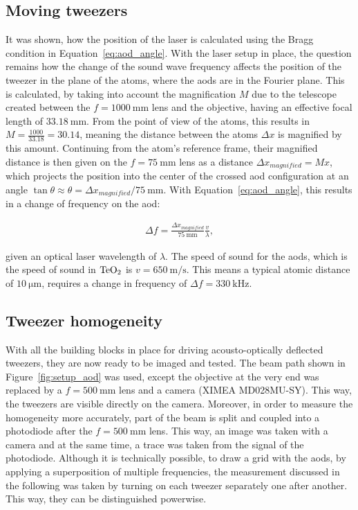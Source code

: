 \subsection{Moving tweezers}%
\label{sec:moving_tweezers}

It was shown, how the position of the laser is calculated using the Bragg condition in Equation~\ref{eq:aod_angle}. With the laser setup in place, the question remains how the change of the sound wave frequency affects the position of the tweezer in the plane of the atoms, where the \acp{aod} are in the Fourier plane. This is calculated, by taking into account the magnification $M$ due to the telescope created between the $f=\SI{1000}{\milli\meter}$ lens and the objective, having an effective focal length of $\SI{33.18}{\milli\meter}$. From the point of view of the atoms, this results in $M=\frac{1000}{33.18} = 30.14$, meaning the distance between the atoms $\Delta x$ is magnified by this amount. Continuing from the atom's reference frame, their magnified distance is then given on the $f=\SI{75}{\milli\meter}$ lens as a distance $\Delta x_{magnified} = Mx$, which projects the position into the center of the crossed \ac{aod} configuration at an angle $\tan{\theta} \approx \theta = \Delta x_{magnified} / \SI{75}{\milli\meter}$.
With Equation~\ref{eq:aod_angle}, this results in a change of frequency on the \ac{aod}:

\begin{align}
	\Delta f = \frac{\Delta x_{magnified}}{\SI{75}{\milli\meter}} \frac{v}{\lambda},
\end{align}

given an optical laser wavelength of $\lambda$. The speed of sound for the \acp{aod}, which is the speed of sound in $\ce{TeO2}$ is $v=\SI{650}{\meter\per\second}$. This means a typical atomic distance of $\SI{10}{\micro\meter}$, requires a change in frequency of $\Delta f = \SI{330}{\kilo\hertz}$.

\subsection{Tweezer homogeneity}

With all the building blocks in place for driving acousto-optically deflected tweezers, they are now ready to be imaged and tested. The beam path shown in Figure~\ref{fig:setup_aod} was used, except the objective at the very end was replaced by a $f=\SI{500}{\milli\meter}$ lens and a camera (XIMEA MD028MU-SY). This way, the tweezers are visible directly on the camera. Moreover, in order to measure the homogeneity more accurately, part of the beam is split and coupled into a photodiode after the $f=\SI{500}{\milli\meter}$ lens. This way, an image was taken with a camera and at the same time, a trace was taken from the signal of the photodiode. Although it is technically possible, to draw a grid with the \acp{aod}, by applying a superposition of multiple frequencies, the measurement discussed in the following was taken by turning on each tweezer separately one after another. This way, they can be distinguished powerwise.

